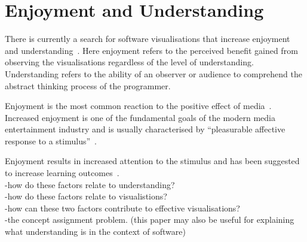 


\section{Enjoyment and Understanding}

There is currently a search for software visualisations that increase enjoyment and understanding~\cite{McLean2010a}. Here enjoyment refers to the perceived benefit gained from observing the visualisations regardless of the level of understanding. Understanding refers to the ability of an observer or audience to comprehend the abstract thinking process of the programmer.

Enjoyment is the most common reaction to the positive effect of media~\cite{Vorderer2004}. Increased enjoyment is one of the fundamental goals of the modern media entertainment industry and is usually characterised by ``pleasurable affective response to a stimulus''~\cite{Brock2004}. 

Enjoyment results in increased attention to the stimulus and has been suggested to increase learning outcomes~.\\
-how do these factors relate to understanding?\\
-how do these factors relate to visualistions?\\
-how can these two factors contribute to effective visualisations?\\
-the concept assignment problem. \cite{Biggerstaff1994} (this paper may also be useful for explaining what understanding is in the context of software)

